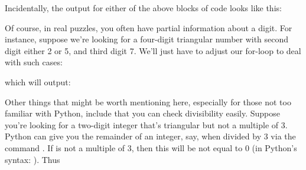 \documentclass[letterpaper,10pt,english]{sphinxmanual}
\begin{document}
Incidentally, the output for either of the above blocks of code looks like this:

\begin{sphinxVerbatim}[commandchars=\\\{\}]
 
 
 
 
 
 
 
 
 
\end{sphinxVerbatim}

Of course, in real puzzles, you often have partial information about a digit. For instance, suppose we’re looking for a four-digit triangular number with second digit either 2 or 5, and third digit 7. We’ll just have to adjust our for-loop to deal with such cases:

\begin{sphinxVerbatim}[commandchars=\\\{\}]
   
      \PYG{p}{[}\PYG{p}{]}  
\end{sphinxVerbatim}

which will output:

\begin{sphinxVerbatim}[commandchars=\\\{\}]
\end{sphinxVerbatim}

Other things that might be worth mentioning here, especially for those not too familiar with Python, include that you can check divisibility easily. Suppose you’re looking for a two-digit integer that’s triangular but not a multiple of 3. Python can give you the remainder of an integer,  say, when divided by 3 via the command . If  is not a multiple of 3, then this will be not equal to 0 (in Python’s syntax: ). Thus

\begin{sphinxVerbatim}[commandchars=\\\{\}]
   
      
\end{sphinxVerbatim}
\end{document}
